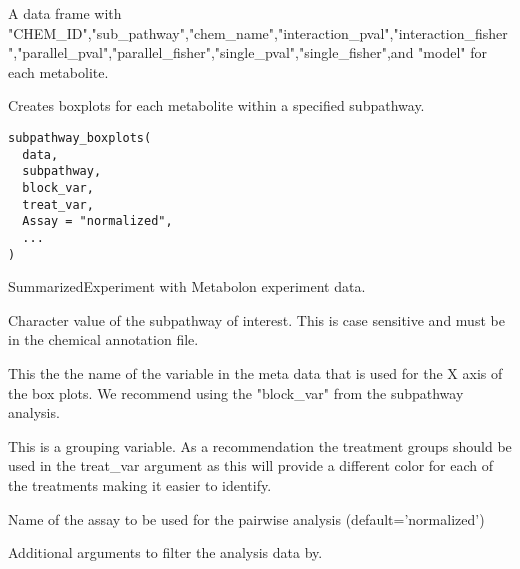 \documentclass[a4paper]{book}
\begin{document}
%
\begin{Value}
A data frame with "CHEM\_ID","sub\_pathway","chem\_name","interaction\_pval","interaction\_fisher","parallel\_pval","parallel\_fisher","single\_pval","single\_fisher",and "model" for each metabolite.
\end{Value}
%
\begin{SeeAlso}
\end{SeeAlso}
%
\begin{Description}
Creates boxplots for each metabolite within a specified subpathway.
\end{Description}
%
\begin{Usage}
\begin{verbatim}
subpathway_boxplots(
  data,
  subpathway,
  block_var,
  treat_var,
  Assay = "normalized",
  ...
)
\end{verbatim}
\end{Usage}
%
\begin{Arguments}
\begin{ldescription}
\item[\code{data}] SummarizedExperiment with Metabolon experiment data.

\item[\code{subpathway}] Character value of the subpathway of interest. This is case
sensitive and must be in the chemical annotation file.

\item[\code{block\_var}] This the the name of the variable in the meta data that is used for the
X axis of the box plots. We recommend using the "block\_var" from the subpathway
analysis.

\item[\code{treat\_var}] This is a grouping variable. As a recommendation the treatment
groups should be used in the treat\_var argument as this will provide a different color
for each of the treatments making it easier to identify.

\item[\code{Assay}] Name of the assay to be used for the pairwise analysis (default='normalized')

\item[\code{...}] Additional arguments to filter the analysis data by.
\end{ldescription}
\end{Arguments}
\end{document}
